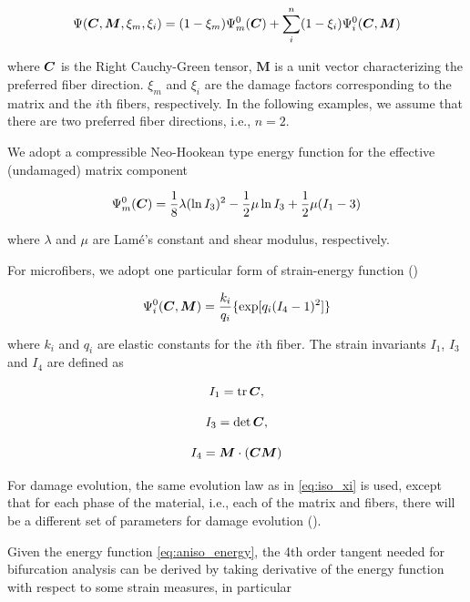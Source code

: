 \documentclass[12pt]{article}
\newcommand{\mbs}[1]{\boldsymbol{#1}}
\def\bM{{\mbs{M}}} \def\bN{{\mbs{N}}} \def\bO{{\mbs{O}}}
\DeclareMathOperator{\tr}{tr}
\numberwithin{equation}{section}
\begin{document}
\begin{equation}\label{eq:aniso_energy}
  \Psi (\bC, \bM, \xi_m, \xi_i) 
    = (1-\xi_m) \Psi_m^0(\bC) 
    + \sum_{i}^{n} (1-\xi_i)\Psi_i^0(\bC, \bM)
\end{equation}

where $\bC$ is the Right Cauchy-Green tensor, $\bM$ is a
unit vector characterizing the preferred fiber direction. $\xi_m$ and
$\xi_i$ are the damage factors corresponding to the matrix and the 
$i$th fibers, respectively. In the following examples, we assume that 
there are two preferred fiber directions, i.e., $n=2$.

We adopt a compressible Neo-Hookean type energy function for the 
effective (undamaged) matrix component

\begin{equation}\label{eq:aniso_Psim0}
  \Psi_m^0 (\bC) 
    = \frac{1}{8}\lambda (\ln I_3)^2
    - \frac{1}{2}\mu \ln I_3 
    + \frac{1}{2}\mu( I_1 - 3)
\end{equation}

where $\lambda$ and $\mu$ are Lam\'{e}'s constant and shear modulus,
respectively.  

For microfibers, we adopt one particular form of strain-energy 
function (\cite{Holzapfel.etal:2010})

\begin{equation}
  \Psi_i^0(\bC, \bM) 
    = \frac{k_i}{q_i}
    \{ \exp[q_i(I_4 - 1)^2] \}
\end{equation}

where $k_i$ and $q_i$ are elastic constants for the $i$th fiber. 
The strain invariants $I_1$, $I_3$ and $I_4$ are defined as

\begin{equation}
  I_1 = \tr \bC, 
\end{equation}

\begin{equation}
  I_3 = \det \bC,
\end{equation}

\begin{equation}
  I_4 = \bM \cdot (\bC \bM)
\end{equation}

For damage evolution, the same evolution law as in \eqref{eq:iso_xi} 
is used, except that for each phase of the material, i.e., each of the 
matrix and fibers, there will be a different set of parameters for
damage evolution (\cite{Chen.etal:2014}).

Given the energy function \eqref{eq:aniso_energy}, the 4th order
tangent needed for bifurcation analysis can be derived by taking
derivative of the energy function with respect to some strain 
measures, in particular
\end{document}
